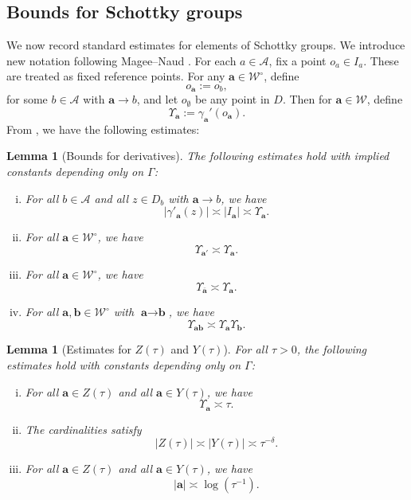 \documentclass[12pt,letterpaper]{amsart}
\theoremstyle{plain}
\newtheorem{lemma}[prop]{Lemma}
\theoremstyle{definition}
\theoremstyle{remark}
\newcommand{\Aa}{\textbf{a}}
\newcommand{\Bb}{\textbf{b}}
\begin{document}
\subsection{Bounds for Schottky groups}\label{sec:boundsForDeriv}
We now record standard estimates for elements of Schottky groups. We introduce new notation following Magee--Naud \cite{NaudMagee}. For each $a \in \mathcal{A}$, fix a point $o_a \in I_a$. These are treated as fixed reference points. For any $\textbf{a} \in \mathcal{W}^\circ$, define
\[
o_{\textbf{a}} := o_b,
\]
for some $b \in \mathcal{A}$ with $\textbf{a} \to b$, and let $o_\emptyset$ be any point in $D$. Then for $\textbf{a} \in \mathcal{W}$, define
\begin{equation}\label{defi:Upsilon}
\Upsilon_{\textbf{a}} := \gamma_{\textbf{a}}'(o_{\textbf{a}}).
\end{equation}
From \cite{NaudMagee}, we have the following estimates:

\begin{lemma}[Bounds for derivatives]\label{lem:boundsderivatives}
The following estimates hold with implied constants depending only on $\Gamma$:
\begin{enumerate}[(i)]
\item \label{part:ups} For all $b \in \mathcal{A}$ and all $z \in D_b$ with $\Aa \to b$, we have
\[
|\gamma'_{\Aa}(z)| \asymp \vert I_\Aa\vert \asymp \Upsilon_{\Aa}.
\]

\item For all $\Aa \in \mathcal{W}^\circ$, we have
\[
\Upsilon_{\Aa'} \asymp \Upsilon_{\Aa}.
\]

\item \label{part:mirrorEst} For all $\Aa \in \mathcal{W}^\circ$, we have
\[
\Upsilon_{\overline{\Aa}} \asymp \Upsilon_{\Aa}.
\]

\item \label{part:almostMultip} For all $\Aa, \Bb \in \mathcal{W}^\circ$ with $\Aa \to \Bb$, we have
\[
\Upsilon_{\Aa\Bb} \asymp \Upsilon_{\Aa} \Upsilon_{\Bb}.
\]
\end{enumerate}
\end{lemma}

\begin{lemma}[Estimates for $Z(\tau)$ and $Y(\tau)$]\label{lem:YZ}
For all $\tau > 0$, the following estimates hold with constants depending only on $\Gamma$:
\begin{enumerate}[(i)]
\item For all $\Aa \in Z(\tau)$ and all $\Aa \in Y(\tau)$, we have
\[
\Upsilon_{\Aa} \asymp \tau.
\]

\item \label{cardinalityzy} The cardinalities satisfy
\[
|Z(\tau)| \asymp |Y(\tau)| \asymp \tau^{-\delta}.
\]

\item \label{lengthsofwords} For all $\Aa \in Z(\tau)$ and all $\Aa \in Y(\tau)$, we have
\[
|\Aa| \asymp \log(\tau^{-1}).
\]
\end{enumerate}
\end{lemma}
\end{document}
